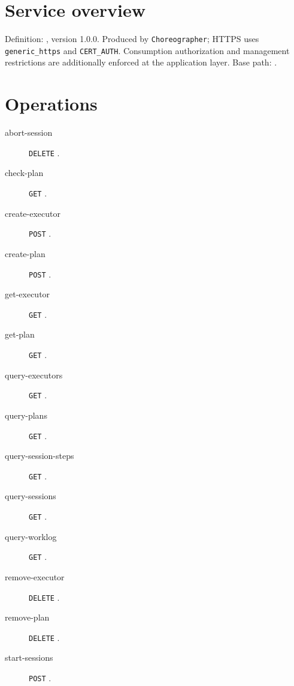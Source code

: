 \documentclass[a4paper]{arrowhead}
\begin{document}
\ArrowheadSetup
\section{Service overview}
Definition: , version 1.0.0. Produced by \texttt{Choreographer}; HTTPS uses \texttt{generic\_https} and \texttt{CERT\_AUTH}. Consumption authorization and management restrictions are additionally enforced at the application layer. Base path: .
\section{Operations}
\begin{description}
\item[abort-session] \texttt{DELETE} .
\item[check-plan] \texttt{GET} .
\item[create-executor] \texttt{POST} .
\item[create-plan] \texttt{POST} .
\item[get-executor] \texttt{GET} .
\item[get-plan] \texttt{GET} .
\item[query-executors] \texttt{GET} .
\item[query-plans] \texttt{GET} .
\item[query-session-steps] \texttt{GET} .
\item[query-sessions] \texttt{GET} .
\item[query-worklog] \texttt{GET} .
\item[remove-executor] \texttt{DELETE} .
\item[remove-plan] \texttt{DELETE} .
\item[start-sessions] \texttt{POST} .
\end{description}
\end{document}
